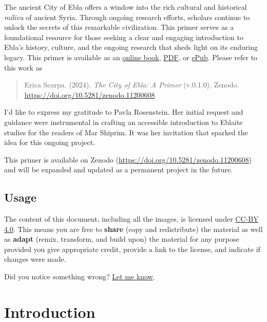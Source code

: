 \documentclass[
]{book}
\begin{document}
The ancient City of Ebla offers a window into the rich cultural and historical \emph{milieu} of ancient Syria. Through ongoing research efforts, scholars continue to unlock the secrets of this remarkable civilization. This primer serves as a foundational resource for those seeking a clear and engaging introduction to Ebla's history, culture, and the ongoing research that sheds light on its enduring legacy. This primer is available as an \href{https://erica-scarpa.github.io/the-city-of-ebla-primer/}{online book}, \href{https://erica-scarpa.github.io/the-city-of-ebla-primer/_main.pdf}{PDF}, or \href{https://erica-scarpa.github.io/the-city-of-ebla-primer/_main.epub}{ePub}.
Please refer to this work as

\begin{quote}
Erica Scarpa. (2024). \emph{The City of Ebla: A Primer} (v.0.1.0). Zenodo. \url{https://doi.org/10.5281/zenodo.11200608}
\end{quote}

I'd like to express my gratitude to Pavla Rosenstein. Her initial request and guidance were instrumental in crafting an accessible introduction to Eblaite studies for the readers of Mar Shiprim. It was her invitation that sparked the idea for this ongoing project.

This primer is available on Zenodo (\url{https://doi.org/10.5281/zenodo.11200608}) and will be expanded and updated as a permanent project in the future.

\hypertarget{usage}{%
\section*{Usage}\label{usage}}

The content of this document, including all the images, is licensed under \href{https://creativecommons.org/licenses/by-sa/4.0/}{CC-BY 4.0}. This means you are free to \textbf{share} (copy and redistribute) the material as well as \textbf{adapt} (remix, transform, and build upon) the material for any purpose provided you give appropriate credit, provide a link to the license, and indicate if changes were made.

Did you notice something wrong? \href{mailto:erica.scarpa@cnr.it}{Let me know}.

\hypertarget{introduction}{%
\chapter{Introduction}\label{introduction}}
\end{document}
